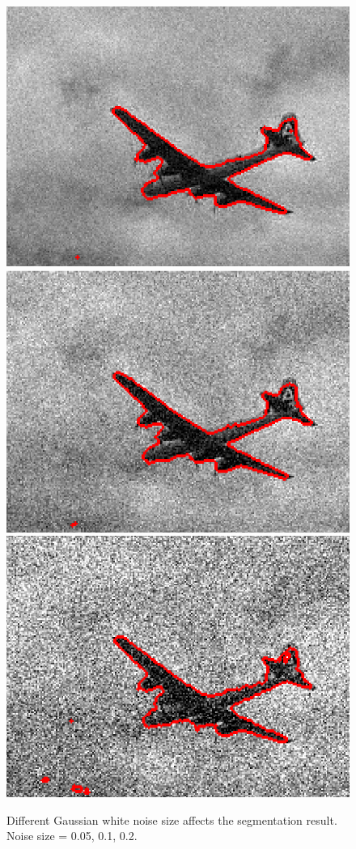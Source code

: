 \documentclass{article}
\begin{document}
\begin{figure}[H]
\caption{Different Gaussian white noise size affects the segmentation result. Noise size = 0.05, 0.1, 0.2.}
\begin{center}
\includegraphics[scale=.27]{cv_sigma05.png}
\includegraphics[scale=.27]{cv_sigma1.png}
\includegraphics[scale=.27]{cv_sigma2.png}
\end{center}
\end{figure}
\end{document}
